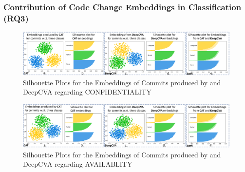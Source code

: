 \subsubsection{\bf Contribution of Code Change Embeddings in Classification (RQ3)}

\begin{figure}[t]
	\centering
	\includegraphics[width=6.9in]{graphs/confidentiality}
        \vspace{-6pt}
	\caption{Silhouette Plots for the Embeddings of Commits produced by {\tool} and DeepCVA regarding CONFIDENTIALITY}
	\label{fig:confidentiality}
\end{figure}


\begin{figure}[t]
	\centering
	\includegraphics[width=6.9in]{graphs/availability}
       \vspace{-6pt}
	\caption{Silhouette Plots for the Embeddings of Commits produced by {\tool} and DeepCVA regarding AVAILABLITY}
	\label{fig:availability}
\end{figure}

%


